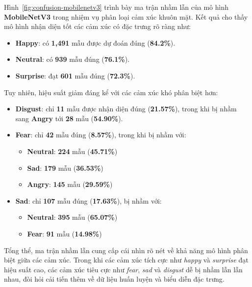 Hình~\ref{fig:confusion-mobilenetv3} trình bày ma trận nhầm lẫn của mô hình \textbf{MobileNetV3} trong nhiệm vụ phân loại cảm xúc khuôn mặt. Kết quả cho thấy mô hình nhận diện tốt các cảm xúc có đặc trưng rõ ràng như:

\begin{itemize}
    \item \textbf{Happy}: có \textbf{1,491} mẫu được dự đoán đúng (\textbf{84.2\%}).
    \item \textbf{Neutral}: có \textbf{939} mẫu đúng (\textbf{76.1\%}).
    \item \textbf{Surprise}: đạt \textbf{601} mẫu đúng (\textbf{72.3\%}).
\end{itemize}

Tuy nhiên, hiệu suất giảm đáng kể với các cảm xúc khó phân biệt hơn:

\begin{itemize}
    \item \textbf{Disgust}: chỉ \textbf{11} mẫu được nhận diện đúng (\textbf{21.57\%}), trong khi bị nhầm sang \textbf{Angry} tới \textbf{28} mẫu (\textbf{54.90\%}).
    
    \item \textbf{Fear}: chỉ \textbf{42} mẫu đúng (\textbf{8.57\%}), trong khi bị nhầm với:
    \begin{itemize}
        \item \textbf{Neutral}: \textbf{224} mẫu (\textbf{45.71\%})
        \item \textbf{Sad}: \textbf{179} mẫu (\textbf{36.53\%})
        \item \textbf{Angry}: \textbf{145} mẫu (\textbf{29.59\%})
    \end{itemize}

    \item \textbf{Sad}: chỉ \textbf{107} mẫu đúng (\textbf{17.63\%}), bị nhầm với:
    \begin{itemize}
        \item \textbf{Neutral}: \textbf{395} mẫu (\textbf{65.07\%})
        \item \textbf{Fear}: \textbf{91} mẫu (\textbf{14.98\%})
    \end{itemize}
\end{itemize}

Tổng thể, ma trận nhầm lẫn cung cấp cái nhìn rõ nét về khả năng mô hình phân biệt giữa các cảm xúc. Trong khi các cảm xúc tích cực như \textit{happy} và \textit{surprise} đạt hiệu suất cao, các cảm xúc tiêu cực như \textit{fear}, \textit{sad} và \textit{disgust} dễ bị nhầm lẫn lẫn nhau, đòi hỏi cải tiến thêm về dữ liệu huấn luyện và biểu diễn đặc trưng.

